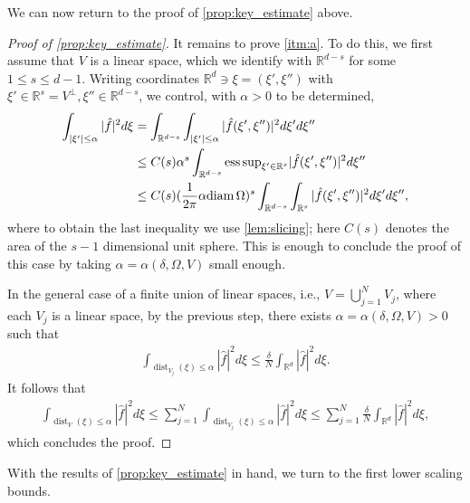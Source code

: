 \documentclass[a4paper, 10pt, twoside, notitlepage]{amsart}
\theoremstyle{plain}
\newcommand{\R}{\mathbb{R}}
\newcommand{\diam}{\textup{diam}}
\DeclareMathOperator{\dist}{dist}
\begin{document}
		We can now return to the proof of \cref{prop:key_estimate} above.
		\begin{proof}[Proof of \cref{prop:key_estimate}]
			It remains to prove \cref{itm:a}. To do this, we first assume that $V$ is a linear space, which we identify with $\R^{d-s}$ for some $1\leq s\leq d-1$. Writing coordinates
			$\R^d\ni\xi=(\xi',\xi'')$ with $\xi'\in\R^s = V^\perp, \xi'' \in \R^{d-s}$, we control, with $\alpha>0$ to be determined,
			\begin{align*}
                          \int_{|\xi'|\leq \alpha}|\hat f|^2d\xi&=\int_{\R^{d-s}}\int_{|\xi'|\leq \alpha}|\hat f(\xi',\xi'')|^2 d\xi'd\xi''\\
                          & \leq C(s)\alpha^s\int_{\R^{d-s}}\mathrm{ess\,sup}_{\xi' \in\R^s}|\hat f(\xi',\xi'')|^2 d\xi''\\
				&\leq C(s)(\frac{1}{2\pi} \alpha\diam\,\Omega)^s\int_{\R^{d-s}}\int_{\R^s}|\hat f(\xi',\xi'')|^2d\xi' d\xi'',
			\end{align*}
			where to obtain the last inequality we use \cref{lem:slicing}; here $C(s)$ denotes the area of the $s-1$ dimensional unit sphere.  This is enough to conclude the proof of this case by
			taking $\alpha = \alpha(\delta,\Omega,V)$ small enough.
			
			In the general case of a finite union of linear spaces, i.e., $V=\bigcup_{j=1}^NV_j$, where each $V_j$ is a linear space, by the previous step, there exists $\alpha = \alpha(\delta,\Omega,V)>0$ such that
			\begin{align*}
			\int_{\dist_{V_j}(\xi)\leq \alpha}|\hat f|^2d\xi\leq \frac{\delta}{N}\int_{\R^d}|\hat f|^2d\xi.
                        \end{align*}
			It follows that
			\begin{align*}
			\int_{\dist_V(\xi)\leq \alpha}|\hat f|^2d\xi\leq \sum_{j=1}^N \int_{\dist_{V_j}(\xi)\leq \alpha}|\hat f|^2d\xi\leq \sum_{j=1}^N \frac{\delta}{N}\int_{\R^d}|\hat f|^2d\xi,
                        \end{align*}
			which concludes the proof.
		\end{proof}
	
With the results of \cref{prop:key_estimate} in hand, we turn to the first lower scaling bounds.		
		
\end{document}

